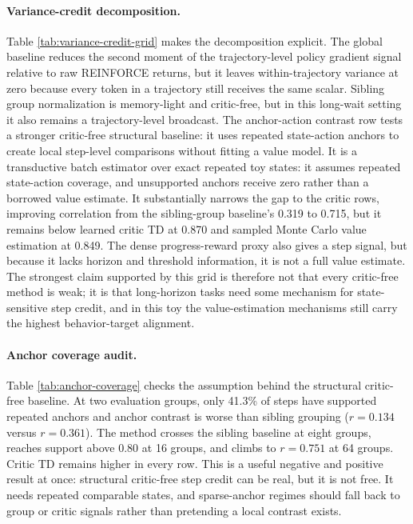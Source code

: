 \documentclass[11pt]{article}
\begin{document}
\paragraph{Variance-credit decomposition.}
Table \ref{tab:variance-credit-grid} makes the decomposition explicit. The
global baseline reduces the second moment of the trajectory-level policy
gradient signal relative to raw REINFORCE returns, but it leaves
within-trajectory variance at zero because every token in a trajectory still
receives the same scalar. Sibling group normalization is memory-light and
critic-free, but in this long-wait setting it also remains a trajectory-level
broadcast. The anchor-action contrast row tests a stronger critic-free
structural baseline: it uses repeated state-action anchors to create local
step-level comparisons without fitting a value model. It is a transductive
batch estimator over exact repeated toy states: it assumes repeated
state-action coverage, and unsupported anchors receive zero rather than a
borrowed value estimate. It substantially narrows
the gap to the critic rows, improving correlation from the sibling-group
baseline's 0.319 to 0.715, but it remains below learned critic TD at 0.870 and
sampled Monte Carlo value estimation at 0.849. The dense progress-reward proxy
also gives a step signal, but because it lacks horizon and threshold
information, it is not a full value estimate. The strongest claim supported by
this grid is therefore not that every critic-free method is weak; it is that
long-horizon tasks need some mechanism for state-sensitive step credit, and in
this toy the value-estimation mechanisms still carry the highest behavior-target
alignment.

\begin{table}[!htbp]
\centering
\caption{Anchor-coverage audit over five seeds. Groups is the number of
evaluation prompt groups in the estimator batch; Support is the fraction of
steps with leave-one-out state-action anchor support. $A-G$ is anchor $r$ minus
group $r$; $C-A$ is critic $r$ minus anchor $r$.}
\label{tab:anchor-coverage}
\scriptsize

\end{table}

\paragraph{Anchor coverage audit.}
Table \ref{tab:anchor-coverage} checks the assumption behind the structural
critic-free baseline. At two evaluation groups, only 41.3\% of steps have
supported repeated anchors and anchor contrast is worse than sibling grouping
($r=0.134$ versus $r=0.361$). The method crosses the sibling baseline at eight
groups, reaches support above 0.80 at 16 groups, and climbs to $r=0.751$ at 64
groups. Critic TD remains higher in every row. This is a useful negative and
positive result at once: structural critic-free step credit can be real, but it
is not free. It needs repeated comparable states, and sparse-anchor regimes
should fall back to group or critic signals rather than pretending a local
contrast exists.
\end{document}
